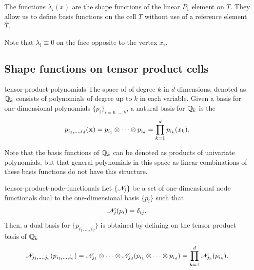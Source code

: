 \begin{remark}
  The functions $\lambda_i(x)$ are the shape functions of the linear
  $P_1$ element on $T$. They allow us to define basis functions on the
  cell $T$ without use of a reference element $\widehat T$.

  Note that $\lambda_i\equiv 0$ on the face opposite to the
  vertex $x_i$.
\end{remark}

\subsection{Shape functions on tensor product cells}

\begin{Definition}{tensor-product-polynomials}
  The space of  of degree $k$ in
  $d$ dimensions, denoted as $\mathbb Q_k$ consists of polynomials of degree
  up to $k$ in each variable. Given a basis for one-dimensional
  polynomials $\{p_i\}_{i=0,\dots,k}$, a natural basis for $\mathbb Q_k$ is
  the 
  \begin{gather}
    \label{eq:fem-intro:1}
    p_{i_1,\dots,i_d}(\mathbf x)
    = p_{i_1}\otimes \dots\otimes p_{i_d}
    = \prod_{k=1}^d p_{i_k}(x_k).
  \end{gather}
\end{Definition}

\begin{remark}
  Note that the basis functions of $\mathbb Q_k$ can be denoted as products
  of univariate polynomials, but that general polynomials in this
  space as linear combinations of these basis functions do not have
  this structure.
\end{remark}

\begin{Lemma}{tensor-product-node-functionals}
  Let $\{\mathscr N_j\}$ be a set of one-dimensional node functionals dual
  to the one-dimensional basis $\{p_i\}$ such that
  \begin{gather}
    \mathscr N_j(p_i) = \delta_{ij}.
  \end{gather}
  Then, a dual basis for $\{p_{i_1,\dots,i_d}\}$ is obtained by
  defining on the tensor product basis of $\mathbb Q_k$
  \begin{gather}
    \label{eq:fem-intro:2}
    \mathscr N_{j_1,\dots,j_d}(p_{i_1,\dots,i_d})
    = \mathscr N_{j_1} \otimes \dots\otimes \mathscr N_{j_d}(p_{i_1}\otimes\dots\otimes p_{i_d})
    = \prod_{k=1}^d \mathscr N_{j_k}(p_{i_k}).
  \end{gather}
\end{Lemma}

